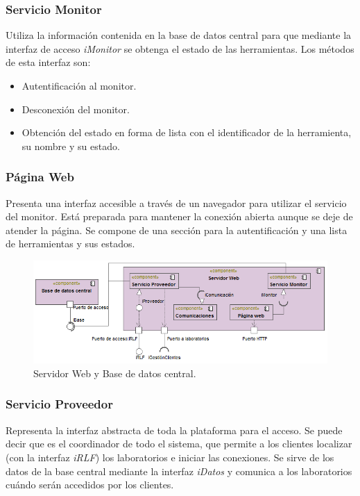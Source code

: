 \subsubsection{Servicio Monitor}
Utiliza la información contenida en la base de datos central para que 
mediante la interfaz de acceso \emph{iMonitor} se obtenga el estado de 
las herramientas. Los métodos de esta interfaz son:

\begin{itemize}
\item Autentificación al monitor.
\item Desconexión del monitor.
\item Obtención del estado en forma de lista con el identificador de 
la herramienta, su nombre y su estado.
\end{itemize}

\subsubsection{Página Web}
Presenta una interfaz accesible a través de un navegador para utilizar 
el servicio del monitor. Está preparada para mantener la conexión 
abierta aunque se deje de atender la página. Se compone de una 
sección para la autentificación y una lista de herramientas y sus 
estados.

\begin{figure}[H]
	\centering
	\includegraphics[scale=0.6]{images/Proveedor.png}
	\caption{Servidor Web y Base de datos central.}
	\label{fig:Proveedor}
\end{figure}

\subsubsection{Servicio Proveedor}
Representa la interfaz abstracta de toda la plataforma para el acceso. 
Se puede decir que es el coordinador de todo el sistema, que permite a 
los clientes localizar (con la interfaz \emph{iRLF}) los laboratorios 
e iniciar las conexiones. Se sirve de los datos de la base central 
mediante la interfaz \emph{iDatos} y comunica a los laboratorios 
cuándo serán accedidos por los clientes.

